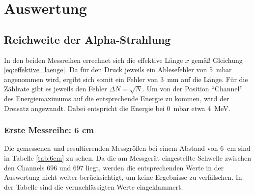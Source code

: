 \section{Auswertung}



\subsection{Reichweite der Alpha-Strahlung}
In den beiden Messreihen errechnet sich die effektive Länge $x$ gemäß Gleichung \ref{eq:effektive_laenge}.
Da für den Druck jeweils ein Ablesefehler von \qty[]{5}{\milli\bar} angenommen wird, ergibt sich somit ein Fehler von 
\qty[]{3}{\mm} auf die Länge.
Für die Zählrate gibt es jeweils den Fehler $\Delta N = \sqrt{N}$.
Um von der Position \enquote{Channel} des Energiemaximums auf die entsprechende Energie zu kommen, wird der Dreisatz angewandt.
Dabei entspricht die Energie bei \qty{0}{\milli\bar} etwa \qty[]{4}{\mega\electronvolt}. 


\subsubsection[]{Erste Messreihe: 6 cm}
Die gemessenen und resultierenden Messgrößen bei einem Abstand von \qty[]{6}{\cm} sind in Tabelle \ref{tab:6cm} zu sehen.
Da die am Messgerät eingestellte Schwelle zwischen den Channels 696 und 697 liegt, werden die entsprechenden Werte
in der Auswertung nicht weiter berücksichtigt, um keine Ergebnisse zu verfälschen.
In der Tabelle sind die vernachlässigten Werte eingeklammert.

